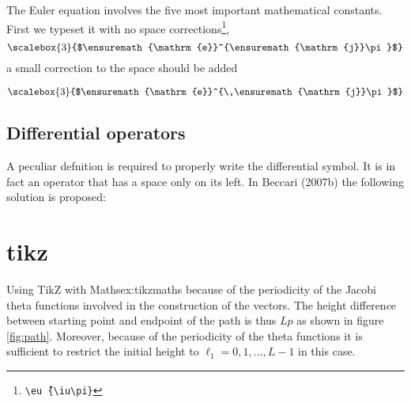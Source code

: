 {{{{The Euler equation involves the five most important mathematical constants. First we typeset it with no space corrections\footnote{\texttt{\textbackslash eu\^\,\{\textbackslash iu\textbackslash pi\}}},
\providecommand*{\eu}%
{\ensuremath{\mathrm{e}}}
\providecommand*{\iu}%
{\ensuremath{\mathrm{j}}}
\[\scalebox{3}{$\eu^{\iu\pi}$}\]
a small correction to the space should be added

\[\scalebox{3}{$\eu^{\,\iu\pi}$}\]

\subsection{Differential operators}
A peculiar defnition is required to properly
write the differential symbol. It is in fact an operator that has a space only on its left. In Beccari (2007b) the following solution is proposed:

\bigskip


\clearpage
\section{tikz}
\begin{texexample}{Using TikZ with Maths}{ex:tikzmaths}
because of the periodicity of the Jacobi theta functions involved in the construction of the vectors.
The height difference between starting point and endpoint of the path is thus $Lp$ as shown in figure \ref{fig:path}. Moreover, because of the periodicity of the theta functions it is sufficient to restrict the initial height to $\ell_1=0,1,\dots,L-1$ in this case.

{  \centering
}
  

\end{texexample}}}}}
